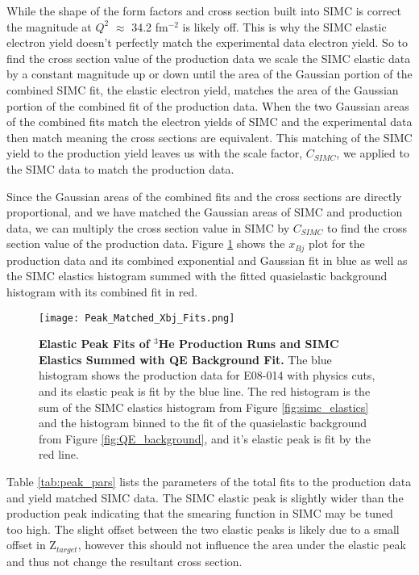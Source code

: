 While the shape of the form factors and cross section built into SIMC is correct the magnitude at $Q^2$ $\approx$ 34.2 fm$^{-2}$ is likely off. This is why the SIMC elastic electron yield doesn't perfectly match the experimental data electron yield. So to find the cross section value of the production data we scale the SIMC elastic data by a constant magnitude up or down until the area of the Gaussian portion of the combined SIMC fit, the elastic electron yield, matches the area of the Gaussian portion of the combined fit of the production data. When the two Gaussian areas of the combined fits match the electron yields of SIMC and the experimental data then match meaning the cross sections are equivalent. This matching of the SIMC yield to the production yield leaves us with the scale factor, $C_{SIMC}$, we applied to the SIMC data to match the production data. 

Since the Gaussian areas of the combined fits and the cross sections are directly proportional, and we have matched the Gaussian areas of SIMC and production data, we can multiply the cross section value in SIMC by $C_{SIMC}$ to find the cross section value of the production data. Figure \ref{fig:final_xs} shows the $x_{Bj}$ plot for the production data and its combined exponential and Gaussian fit in blue as well as the SIMC elastics histogram summed with the fitted quasielastic background histogram with its combined fit in red. 

\begin{figure}[!ht]
\begin{center}
\texttt{[image: Peak\_Matched\_Xbj\_Fits.png]}
\end{center}
\caption[Elastic Peak Fits of $^{3}$He Production Runs and SIMC Elastics Summed with QE Background Fit]{
{\bf{Elastic Peak Fits of $^{3}$He Production Runs and SIMC Elastics Summed with QE Background Fit.}} The blue histogram shows the production data for E08-014 with physics cuts, and its elastic peak is fit by the blue line. The red histogram is the sum of the SIMC elastics histogram from Figure \ref{fig:simc_elastics} and the histogram binned to the fit of the quasielastic background from Figure \ref{fig:QE_background}, and it's elastic peak is fit by the red line.}
\label{fig:final_xs}
\end{figure}

Table \ref{tab:peak_pars} lists the parameters of the total fits to the production data and yield matched SIMC data. The SIMC elastic peak is slightly wider than the production peak indicating that the smearing function in SIMC may be tuned too high. The slight offset between the two elastic peaks is likely due to a small offset in Z$_{target}$, however this should not influence the area under the elastic peak and thus not change the resultant cross section. 


